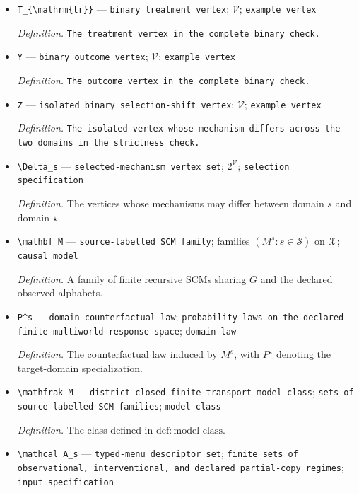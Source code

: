 \documentclass{article}
\begin{document}
\begin{itemize}
  \item \texttt{T\_\allowbreak{}\{\textbackslash{}\allowbreak{}mathrm\{tr\}\allowbreak{}\}\allowbreak{}} --- \texttt{binary treatment vertex}; \(\mathcal V\); \texttt{example vertex}
  \par\smallskip\noindent\emph{Definition.} \texttt{The treatment vertex in the complete binary check.}
  \item \texttt{Y} --- \texttt{binary outcome vertex}; \(\mathcal V\); \texttt{example vertex}
  \par\smallskip\noindent\emph{Definition.} \texttt{The outcome vertex in the complete binary check.}
  \item \texttt{Z} --- \texttt{isolated binary selection-\allowbreak{}shift vertex}; \(\mathcal V\); \texttt{example vertex}
  \par\smallskip\noindent\emph{Definition.} \texttt{The isolated vertex whose mechanism differs across the two domains in the strictness check.}
  \item \texttt{\textbackslash{}\allowbreak{}Delta\_\allowbreak{}s} --- \texttt{selected-\allowbreak{}mechanism vertex set}; \(2^{\mathcal V}\); \texttt{selection specification}
  \par\smallskip\noindent\emph{Definition.} The vertices whose mechanisms may differ between domain \(s\) and domain \(\star\).
  \item \texttt{\textbackslash{}\allowbreak{}mathbf M} --- \texttt{source-\allowbreak{}labelled SCM family}; families \((M^s:s\in\mathcal S)\) on \(\mathcal X\); \texttt{causal model}
  \par\smallskip\noindent\emph{Definition.} A family of finite recursive SCMs sharing \(G\) and the declared observed alphabets.
  \item \texttt{P\textasciicircum{}s} --- \texttt{domain counterfactual law}; \texttt{probability laws on the declared finite multiworld response space}; \texttt{domain law}
  \par\smallskip\noindent\emph{Definition.} The counterfactual law induced by \(M^s\), with \(P^\star\) denoting the target-domain specialization.
  \item \texttt{\textbackslash{}\allowbreak{}mathfrak M} --- \texttt{district-\allowbreak{}closed finite transport model class}; \texttt{sets of source-\allowbreak{}labelled SCM families}; \texttt{model class}
  \par\smallskip\noindent\emph{Definition.} The class defined in \(\mathrm{def:model\text{-}class}\).
  \item \texttt{\textbackslash{}\allowbreak{}mathcal A\_\allowbreak{}s} --- \texttt{typed-\allowbreak{}menu descriptor set}; \texttt{finite sets of observational,\allowbreak{} interventional,\allowbreak{} and declared partial-\allowbreak{}copy regimes}; \texttt{input specification}

\end{itemize}
\end{document}
